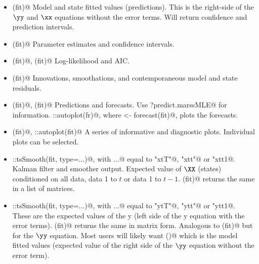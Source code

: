 \begin{itemize}
\item \verb@fitted(fit)@ Model and state fitted values (predictions). This is the right-side of the $\yy$ and $\xx$ equations without the error terms. Will return confidence and prediction intervals.
\item \verb@tidy(fit)@ Parameter estimates and confidence intervals.
\item \verb@logLik(fit)@, \verb@AIC(fit)@ Log-likelihood and AIC.
\item \verb@residuals(fit)@ Innovations, smoothations, and contemporaneous model and state residuals.
\item \verb@predict(fit)@, \verb@forecast(fit)@ Predictions and forecasts. Use \verb@?predict.marssMLE@ for information. ::autoplot(fr)@, where \verb@fr <- forecast(fit)@, plots the forecasts.
\item \verb@plot(fit)@, ::autoplot(fit)@ A series of informative and diagnostic plots. Individual plots can be selected.
\item \verb@stats::tsSmooth(fit, type=...)@, with \verb@...@ equal to \verb@"xtT"@, \verb@"xtt"@ or \verb@"xtt1@.  Kalman filter and smoother output. Expected value of $\XX$ (states) conditioned on all data, data 1 to $t$ or data 1 to $t-1$. \verb@MARSSkf(fit)@ returns the same in a list of matrices.
\item \verb@stats::tsSmooth(fit, type=...)@, with \verb@...@ equal to \verb@"ytT"@, \verb@"ytt"@ or \verb@"ytt1@. These are the expected values of the y (left side of the y equation with the error terms). \verb@MARSShatyt(fit)@ returns the same in matrix form. Analogous to \verb@MARSSkf(fit)@ but for the $\yy$ equation. Most users will likely want \verb@fitted()@ which is the model fitted values (expected value of the right side of the $\yy$ equation without the error term).
\end{itemize}

